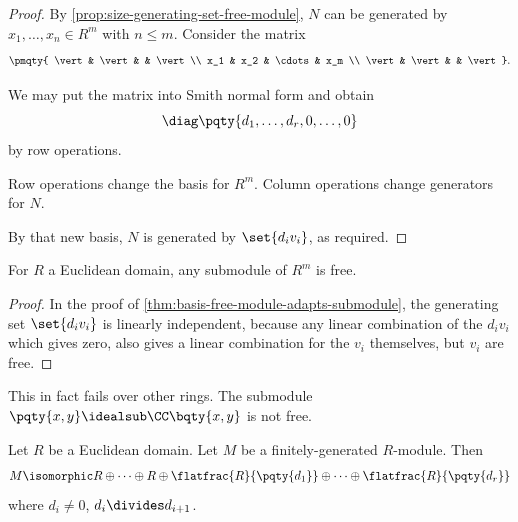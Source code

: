 \begin{proof}

    By \autoref{prop:size-generating-set-free-module}, \(N\) can be generated by \(x_1, \ldots, x_n \in R^m\) with \(n \leq m\). Consider the matrix
    \[
        \pmqty{
            \vert & \vert &  & \vert \\
            x_1 & x_2 & \cdots & x_m \\
            \vert & \vert &  & \vert
        }.
    \]

    We may put the matrix into Smith normal form and obtain
    \[
        \diag\pqty{d_1, \ldots, d_r, 0, \ldots, 0}
    \]
    by row operations.

    Row operations change the basis for \(R^m\). Column operations change generators for \(N\).

    By that new basis, \(N\) is generated by \(\set{d_i v_i}\), as required.
\end{proof}

\begin{theorem}
    \label{thm:submodule-module-euclidean-domain-free}%
    For \(R\) a Euclidean domain, any submodule of \(R^m\) is free.
\end{theorem}

\begin{proof}
    In the proof of \autoref{thm:basis-free-module-adapts-submodule}, the generating set \(\set{d_i v_i}\) is linearly independent, because any linear combination of the \(d_i v_i\) which gives zero, also gives a linear combination for the \(v_i\) themselves, but \(v_i\) are free.
\end{proof}

\begin{remark}
    This in fact fails over other rings. The submodule \(\pqty{x, y} \idealsub \CC\bqty{x, y}\) is not free.
\end{remark}

\begin{theorem}
    \label{thm:classification-finitely-generated-modules-euclidean-domains}%
    Let \(R\) be a Euclidean domain. Let \(M\) be a finitely-generated \(R\)-module. Then
    \[
        M \isomorphic R \oplus \cdots \oplus R \oplus \flatfrac{R}{\pqty{d_1}} \oplus \cdots \oplus \flatfrac{R}{\pqty{d_r}}
    \]
    where \(d_i \neq 0\), \(d_i \divides d_{i + 1}\).
\end{theorem}

